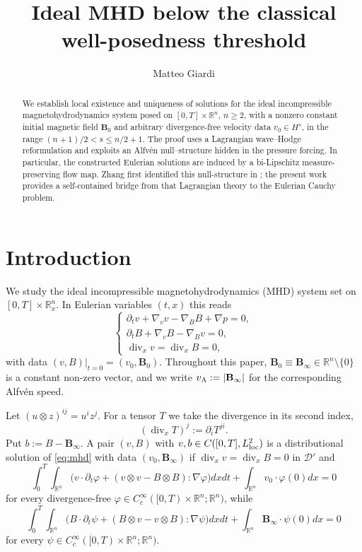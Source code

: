 \documentclass[11pt,reqno]{amsart}
\title[Low-regularity solutions of Ideal MHD]{Ideal MHD below the classical well-posedness threshold}
\author{Matteo Giardi}
\date{}
\theoremstyle{plain}
\theoremstyle{definition}
\theoremstyle{remark}
\numberwithin{equation}{section}
\DeclareMathOperator{\Div}{div}
\newcommand{\Bzero}{\mathbf B_0}
\newcommand{\Binf}{\mathbf B_\infty}
\newcommand{\Real}{\mathbb R}
\newcommand{\Rn}{\Real^n}
\begin{document}
\begin{abstract}
We establish local existence and uniqueness of solutions for the ideal incompressible magnetohydrodynamics system posed on
$[0,T]\times\Rn$, $n\ge2$, with a nonzero constant initial magnetic field $\Bzero$ and arbitrary divergence-free velocity data $v_0\in H^s$, in the range $(n+1)/2<s\le n/2+1$. The proof uses a Lagrangian wave--Hodge reformulation and exploits an Alfvén null--structure hidden in the pressure forcing. In particular, the constructed Eulerian solutions are induced by a bi-Lipschitz measure-preserving flow map. Zhang first identified this null-structure in \cite{Zhang2024}; the present work
provides a self-contained bridge from that Lagrangian theory to the Eulerian Cauchy
problem.
\end{abstract}

\maketitle

\tableofcontents

\section{Introduction}
\label{sec:introduction}

We study the ideal incompressible magnetohydrodynamics (MHD) system set on $[0,T]\times\Rn_x$.  In Eulerian variables
$(t,x)$ this reads 
\begingroup
\renewcommand{\theHequation}{MHD}
\begin{equation}\label{eq:mhd}\tag{MHD}
\begin{cases}
\partial_tv+\nabla_v v-\nabla_B B+\nabla p=0,\\
\partial_tB+\nabla_v B-\nabla_B v=0,\\
\Div_x v=\Div_x B=0,
\end{cases}
\end{equation}
\endgroup
with data $(v,B)|_{t=0}=(v_0,\Bzero)$. Throughout this paper,
$\Bzero\equiv\Binf\in\Rn\setminus\{0\}$ is a constant non-zero vector, and
we write $v_{\rm A}:=|\Binf|$ for the corresponding Alfv\'en speed.

Let $(u\otimes z)^{ij}=u^iz^j$. For a tensor $T$ we take the
divergence in its second index,
\[
 (\Div_xT)^j:=\partial_iT^{ji}.
\]
Put $b:=B-\Binf$. A pair $(v,B)$ with
$v,b\in C([0,T],L^2_{\rm loc})$ is a distributional solution of \eqref{eq:mhd} with data
$(v_0,\Binf)$ if $\Div_{x}v=\Div_{x}B=0$ in $\mathcal D'$ and
\[
 \int_0^T  \int_{\Rn}
 \Big(v\cdot\partial_t\varphi+(v\otimes v-B\otimes B):\nabla\varphi\Big) dx dt
 +\int_{\Rn}v_0\cdot\varphi(0) dx=0
\]
for every divergence-free
$\varphi\in C_c^\infty([0,T)\times\Rn;\Rn)$, while
\[
 \int_0^T  \int_{\Rn}
 \Big(B\cdot\partial_t\psi+(B\otimes v-v\otimes B):\nabla\psi\Big) dx dt
 +\int_{\Rn}\Binf\cdot\psi(0) dx=0
\]
for every $\psi\in C_c^\infty([0,T)\times\Rn;\Rn)$.\\
\end{document}
